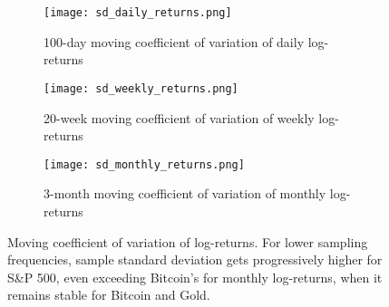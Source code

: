 \documentclass[12pt]{article}
\begin{document}
\begin{figure}[H]
\centering
\begin{subfigure}[b]{.32\textwidth}
\texttt{[image: sd\_daily\_returns.png]}\hfill
\caption{100-day moving coefficient of variation of daily log-returns}
\end{subfigure}
 \hfill
 \begin{subfigure}[b]{.32\textwidth}
\texttt{[image: sd\_weekly\_returns.png]}\hfill
\caption{20-week moving coefficient of variation of weekly log-returns}
\end{subfigure}
 \hfill
  \begin{subfigure}[b]{.32\textwidth}
\texttt{[image: sd\_monthly\_returns.png]}\hfill
\caption{3-month moving coefficient of variation of monthly log-returns}
\end{subfigure}
\caption{Moving coefficient of variation of log-returns. For lower sampling frequencies, sample standard deviation gets progressively higher for S\&P 500, even exceeding Bitcoin's for monthly log-returns, when it remains stable for Bitcoin and Gold. }
\label{sdreturn}
\end{figure}
\end{document}
